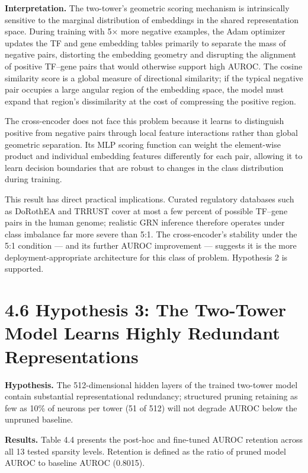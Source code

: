 \documentclass[
  12pt,
]{report}
\begin{document}
\textbf{Interpretation.} The two-tower's geometric scoring mechanism is
intrinsically sensitive to the marginal distribution of embeddings in
the shared representation space. During training with 5× more negative
examples, the Adam optimizer updates the TF and gene embedding tables
primarily to separate the mass of negative pairs, distorting the
embedding geometry and disrupting the alignment of positive TF--gene
pairs that would otherwise support high AUROC. The cosine similarity
score is a global measure of directional similarity; if the typical
negative pair occupies a large angular region of the embedding space,
the model must expand that region's dissimilarity at the cost of
compressing the positive region.

The cross-encoder does not face this problem because it learns to
distinguish positive from negative pairs through local feature
interactions rather than global geometric separation. Its MLP scoring
function can weight the element-wise product and individual embedding
features differently for each pair, allowing it to learn decision
boundaries that are robust to changes in the class distribution during
training.

This result has direct practical implications. Curated regulatory
databases such as DoRothEA and TRRUST cover at most a few percent of
possible TF--gene pairs in the human genome; realistic GRN inference
therefore operates under class imbalance far more severe than 5:1. The
cross-encoder's stability under the 5:1 condition --- and its further
AUROC improvement --- suggests it is the more deployment-appropriate
architecture for this class of problem. Hypothesis 2 is supported.

\section{4.6 Hypothesis 3: The Two-Tower Model Learns Highly Redundant
Representations}\label{hypothesis-3-the-two-tower-model-learns-highly-redundant-representations}

\textbf{Hypothesis.} The 512-dimensional hidden layers of the trained
two-tower model contain substantial representational redundancy;
structured pruning retaining as few as 10\% of neurons per tower (51 of
512) will not degrade AUROC below the unpruned baseline.

\textbf{Results.} Table 4.4 presents the post-hoc and fine-tuned AUROC
retention across all 13 tested sparsity levels. Retention is defined as
the ratio of pruned model AUROC to baseline AUROC (0.8015).
\end{document}
